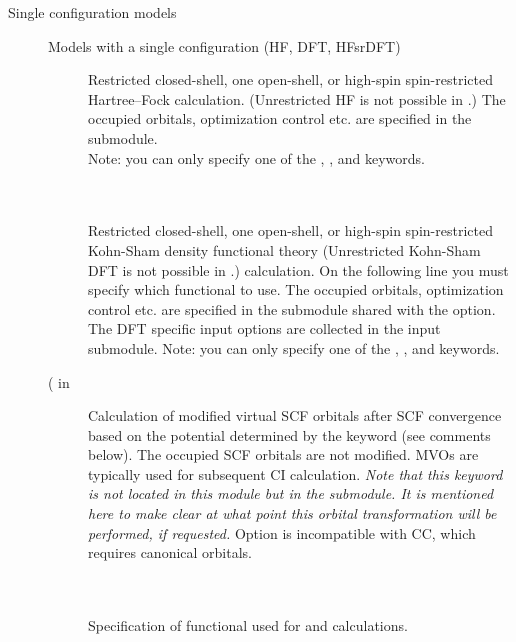 \begin{description}

\item[{\color{blue}Single configuration models}] Models with a single configuration (HF, DFT, HFsrDFT)

\begin{description}

\item[]
  Restricted closed-shell, one open-shell, or high-spin spin-restricted Hartree--Fock calculation.
  (Unrestricted HF is not possible in \dalton.)
  The occupied orbitals, optimization control etc. are specified in the
   submodule. \\
  Note: you can only specify one of the , , and  keywords.

\item[] \ \\
   \\
  Restricted closed-shell, one open-shell, or high-spin spin-restricted Kohn-Sham density functional
  theory
  (Unrestricted Kohn-Sham DFT is not possible in \dalton.)
  calculation.  On the following line you must specify which
  functional to use.  The occupied orbitals, optimization control
  etc. are specified in the  submodule shared with
  the  option. The DFT specific input options are
  collected in the  input submodule.
  Note: you can only specify one of the , , and  keywords.

\item[( in ]
  Calculation of modified virtual SCF orbitals after SCF convergence based on the
  potential determined by the keyword (see comments below).
  The occupied SCF orbitals are not modified.
  MVOs are typically used for subsequent CI calculation.
  {\em Note that this keyword is not located in this module but in the
   submodule. It is mentioned here to make clear
  at what point this orbital transformation will be performed, if requested.}
  Option is incompatible with CC, which requires canonical orbitals.

\item[] \ \\
   \\
  Specification of functional used for  and  calculations.


\end{description}
\end{description}
